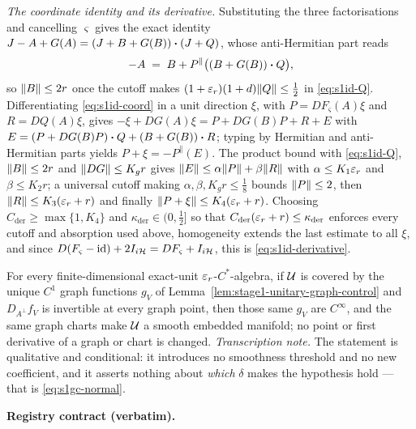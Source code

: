 \emph{The coordinate identity and its derivative.} Substituting the three factorisations and
cancelling $\varsigma$ gives the exact identity
$J-A+G(A)=(J+B+G(B))\mathbin{\bm{\cdot}}(J+Q)$, whose anti-Hermitian part reads
\begin{equation}\label{eq:s1id-coord}
  -A\;=\;B+P^{\parallel}\bigl((B+G(B))\mathbin{\bm{\cdot}} Q\bigr),
\end{equation}
so $\lVert B\rVert\le2r$ once the cutoff makes $(1+\varepsilon_r)(1+d)\lVert Q\rVert\le\tfrac12$ in
\eqref{eq:s1id-Q}. Differentiating \eqref{eq:s1id-coord} in a unit direction $\xi$, with
$P=DF_{\varsigma}(A)\xi$ and $R=DQ(A)\xi$, gives
$-\xi+DG(A)\xi=P+DG(B)P+R+E$ with
$E=(P+DG(B)P)\mathbin{\bm{\cdot}} Q+(B+G(B))\mathbin{\bm{\cdot}} R$; typing by Hermitian and anti-Hermitian parts yields
$P+\xi=-P^{\parallel}(E)$. The product bound with \eqref{eq:s1id-Q}, $\lVert B\rVert\le2r$ and
$\lVert DG\rVert\le K_gr$ gives $\lVert E\rVert\le\alpha\lVert P\rVert+\beta\lVert R\rVert$ with $\alpha\le K_1\varepsilon_r$
and $\beta\le K_2r$; a universal cutoff making $\alpha,\beta,K_gr\le\tfrac18$ bounds
$\lVert P\rVert\le2$, then $\lVert R\rVert\le K_3(\varepsilon_r+r)$ and finally
$\lVert P+\xi\rVert\le K_4(\varepsilon_r+r)$. Choosing $C_{\mathrm{der}}\ge\max\{1,K_4\}$ and
$\kappa_{\mathrm{der}}\in(0,\tfrac12]$ so that $C_{\mathrm{der}}(\varepsilon_r+r)\le
\kappa_{\mathrm{der}}$ enforces every cutoff and absorption used above, homogeneity extends
the last estimate to all $\xi$, and since
$D(F_{\varsigma}-\mathrm{id})+2I_{i\mathcal H}=DF_{\varsigma}+I_{i\mathcal H}$, this is
\eqref{eq:s1id-derivative}.

\begin{lemma}\label{lem:stage1-smooth-unitary-atlas}
For every finite-dimensional exact-unit $\varepsilon_r$-$C^*$-algebra, if $\mathcal U$ is covered by the
unique $C^{1}$ graph functions $g_V$ of Lemma~\ref{lem:stage1-unitary-graph-control} and
$D_{A^{\perp}}f_V$ is invertible at every graph point, then those same $g_V$ are
$C^{\infty}$, and the same graph charts make $\mathcal U$ a smooth embedded manifold; no point or
first derivative of a graph or chart is changed.
\emph{Transcription note.} The statement is qualitative and conditional: it introduces no
smoothness threshold and no new coefficient, and it asserts nothing about \emph{which}
$\delta$ makes the hypothesis hold --- that is \eqref{eq:s1gc-normal}.
\end{lemma}

\noindent\textbf{Registry contract (verbatim).}

